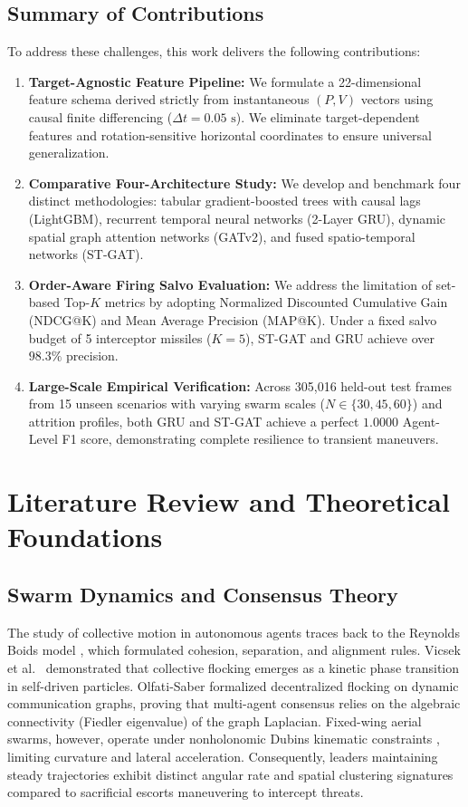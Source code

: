 \documentclass[9pt]{ieeeconf}
\begin{document}
\subsection{Summary of Contributions}
To address these challenges, this work delivers the following contributions:
\begin{enumerate}
    \item \textbf{Target-Agnostic Feature Pipeline:} We formulate a 22-dimensional feature schema derived strictly from instantaneous $(P, V)$ vectors using causal finite differencing ($\Delta t = 0.05\text{ s}$). We eliminate target-dependent features and rotation-sensitive horizontal coordinates to ensure universal generalization.
    \item \textbf{Comparative Four-Architecture Study:} We develop and benchmark four distinct methodologies: tabular gradient-boosted trees with causal lags (LightGBM), recurrent temporal neural networks (2-Layer GRU), dynamic spatial graph attention networks (GATv2), and fused spatio-temporal networks (ST-GAT).
    \item \textbf{Order-Aware Firing Salvo Evaluation:} We address the limitation of set-based Top-$K$ metrics by adopting Normalized Discounted Cumulative Gain (NDCG@K) and Mean Average Precision (MAP@K). Under a fixed salvo budget of 5 interceptor missiles ($K=5$), ST-GAT and GRU achieve over $98.3\%$ precision.
    \item \textbf{Large-Scale Empirical Verification:} Across 305,016 held-out test frames from 15 unseen scenarios with varying swarm scales ($N \in \{30, 45, 60\}$) and attrition profiles, both GRU and ST-GAT achieve a perfect $1.0000$ Agent-Level F1 score, demonstrating complete resilience to transient maneuvers.
\end{enumerate}

\section{Literature Review and Theoretical Foundations}
\label{sec:literature}

\subsection{Swarm Dynamics and Consensus Theory}
The study of collective motion in autonomous agents traces back to the Reynolds Boids model \cite{reynolds1987flocks}, which formulated cohesion, separation, and alignment rules. Vicsek et al.\ \cite{vicsek1995novel} demonstrated that collective flocking emerges as a kinetic phase transition in self-driven particles. Olfati-Saber \cite{olfati2006flocking} formalized decentralized flocking on dynamic communication graphs, proving that multi-agent consensus relies on the algebraic connectivity (Fiedler eigenvalue) of the graph Laplacian. Fixed-wing aerial swarms, however, operate under nonholonomic Dubins kinematic constraints \cite{dubins1957curves}, limiting curvature and lateral acceleration. Consequently, leaders maintaining steady trajectories exhibit distinct angular rate and spatial clustering signatures compared to sacrificial escorts maneuvering to intercept threats.
\end{document}
